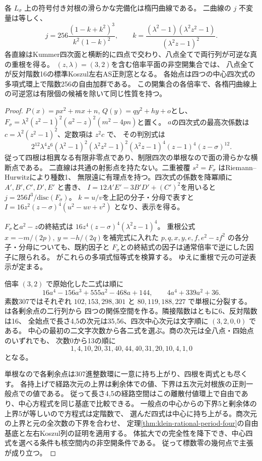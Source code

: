 \begin{theorem}\label{thm:fixed-line-elliptic}
各 $L_\sigma$ 上の符号付き対根の滑らかな完備化は楕円曲線である。
二曲線の $j$ 不変量は等しく、
\[
 j=256\frac{(1-k+k^2)^3}{k^2(1-k)^2},\qquad
 k=\frac{(\lambda^2-1)(\lambda^2z^2-1)}{(\lambda^2z-1)^2}.
\]
各直線はKummer四次面と横断的に四点で交わり、八点全てで両行列が可逆な真の重根を得る。
$(z,\lambda)=(3,2)$を含む倍率平面の非空開集合では、
八点全てが反対階数16の標準Koszul左右AS正則窓となる。
各始点は四つの中心四次式の多項式環上で階数256の自由加群である。
この開集合の各倍率で、各楕円曲線上の可逆窓は有限個の候補を除いて同じ性質を持つ。
\end{theorem}
\begin{proof}
$P(x)=px^2+mx+n$, $Q(y)=qy^2+hy+o$とし、
$F_\sigma=\lambda^2(z^2-1)^2(a^2-z)^2(m^2-4pn)$と置く。
$a$の四次式の最高次係数は $c=\lambda^2(z^2-1)^2$、定数項は $z^2c$ で、
その判別式は
\[
 2^{12}\lambda^4 z^6(\lambda^2-1)^2(\lambda^2 z^2-1)^2
 (\lambda^2z-1)^4(z-1)^4(z-\sigma)^{12}.
\]
従って四根は相異なる有限非零点であり、制限四次の単根なので面の滑らかな横断点である。
二直線は共通の射影点を持たない。二重被覆 $s^2=F_\sigma$ はRiemann--Hurwitzにより種数1、
無限遠に有理点を持つ。四次式の係数を降冪順に $A',B',C',D',E'$ と書き、
$I=12A'E'-3B'D'+(C')^2$を用いると $j=256I^3/\mathrm{disc}(F_\sigma)$。
$k=u/v$を上記の分子・分母で表すと
$I=16z^2(z-\sigma)^4(u^2-uv+v^2)$ となり、表示を得る。

$F_\sigma$と$a^2-z$の終結式は $16z^4(z-\sigma)^4(\lambda^2z-1)^4$。
重根公式 $x=-m/(2p),\ y=-h/(2q)$を補完式に入れた
$p,q,x,y,e,f,e^2-zf^2$ の各分子・分母についても、既約因子と
$F_\sigma$との終結式の因子は通常倍率で逆にした因子に限られる。
 がこれらの多項式恒等式を検算する。
ゆえに重根で元の可逆表示が定まる。

倍率 $(3,2)$ で原始化した二式は順に
\[
 16a^4-156a^3+555a^2-468a+144,\qquad 4a^4+339a^2+36.
\]
素数307ではそれぞれ $102,153,298,301$ と $80,119,188,227$ で単根に分裂する。
 は各剰余点の二行列から
四つの関係空間を作る。隣接階数はともに6、反対階数は16、
全始点で長さ4,5の次元は35,56、四次中心次元は文字順に $(3,2,0,0)$ である。
中心の最初の二文字次数から各二式を選ぶ。商の次元は全八点・四始点のいずれでも、
次数0から13の順に
\[
 1,4,10,20,31,40,44,40,31,20,10,4,1,0
\]
となる。

単根なので各剰余点は307進整数環に一意に持ち上がり、四根を両式とも尽くす。
各持上げで経路次元の上界は剰余体での値、下界は五次元対根族の正則一般点での値である。
従って長さ4,5の経路空間はこの離散付値環上で自由であり、中心方程式を同じ基底で比較できる。
一般点の中心からの下界5と剰余体の上界5が等しいので方程式は定階数で、
選んだ四式は中心に持ち上がる。商次元の上界と元の全次数の下界を合わせ、
定理\ref{thm:klein-rational-period-four}の自由基底と左右Koszul列の証明を適用する。
体拡大での完全性を降下でき、中心四式を選べる条件も核空間内の非空開条件である。
従って標数零の幾何点で主張が成り立つ。


\end{proof}
